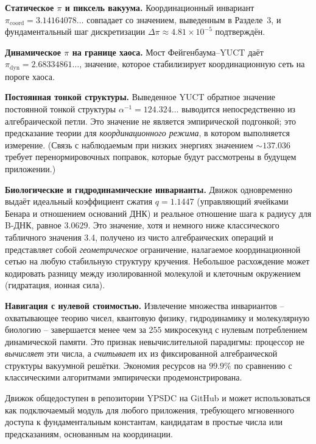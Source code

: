 \documentclass[12pt,a4paper]{article}
\begin{document}
	\textbf{Статическое $\pi$ и пиксель вакуума.} Координационный инвариант $\pi_{\mathrm{coord}} = 3.14164078\ldots$ совпадает со значением, выведенным в Разделе~3, и фундаментальный шаг дискретизации $\Delta\pi \approx 4.81\times10^{-5}$ подтверждён.
	
	\textbf{Динамическое $\pi$ на границе хаоса.} Мост Фейгенбаума–YUCT даёт $\pi_{\mathrm{dyn}} = 2.68334861\ldots$, значение, которое стабилизирует координационную сеть на пороге хаоса.
	
	\textbf{Постоянная тонкой структуры.} Выведенное YUCT обратное значение постоянной тонкой структуры $\alpha^{-1} = 124.324\ldots$ выводится непосредственно из алгебраической петли. Это значение не является эмпирической подгонкой; это предсказание теории для \emph{координационного режима}, в котором выполняется измерение. (Связь с наблюдаемым при низких энергиях значением $\sim 137.036$ требует перенормировочных поправок, которые будут рассмотрены в будущем приложении.)
	
	\textbf{Биологические и гидродинамические инварианты.} Движок одновременно выдаёт идеальный коэффициент сжатия $q = 1.1447$ (управляющий ячейками Бенара и отношением оснований ДНК) и реальное отношение шага к радиусу для B-ДНК, равное $3.0629$. Это значение, хотя и немного ниже классического табличного значения 3.4, получено из чисто алгебраических операций и представляет собой \emph{геометрическое} ограничение, налагаемое координационной сетью на любую стабильную структуру кручения. Небольшое расхождение может кодировать разницу между изолированной молекулой и клеточным окружением (гидратация, ионная сила).
	
	\textbf{Навигация с нулевой стоимостью.} Извлечение множества инвариантов – охватывающее теорию чисел, квантовую физику, гидродинамику и молекулярную биологию – завершается менее чем за $255$ микросекунд с нулевым потреблением динамической памяти. Это признак невычислительной парадигмы: процессор не \emph{вычисляет} эти числа, а \emph{считывает} их из фиксированной алгебраической структуры вакуумной решётки. Экономия ресурсов на $99.9\%$ по сравнению с классическими алгоритмами эмпирически продемонстрирована.
	
	Движок общедоступен в репозитории YPSDC на GitHub и может использоваться как подключаемый модуль для любого приложения, требующего мгновенного доступа к фундаментальным константам, кандидатам в простые числа или предсказаниям, основанным на координации.
	
\end{document}
